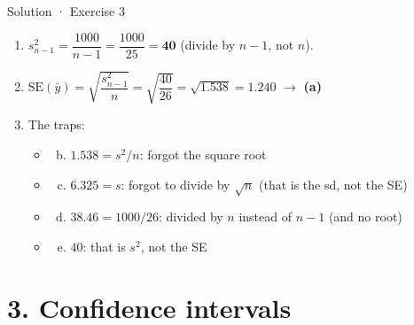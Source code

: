 \documentclass[
  11pt,
  ignorenonframetext,
  aspectratio=169,
]{beamer}
\providecommand{\tightlist}{%
  \setlength{\itemsep}{0pt}\setlength{\parskip}{0pt}}
\newcommand{\se}{\mathrm{SE}}
\begin{document}
\begin{frame}{Solution · Exercise 3}
\protect{}\label{solution-exercise-3}
\begin{enumerate}
\item
  \(s^2_{n-1}=\dfrac{1000}{n-1}=\dfrac{1000}{25}=\mathbf{40}\) (divide
  by \(n-1\), not \(n\)).
\item
  \(\se(\bar y)=\sqrt{\dfrac{s^2_{n-1}}{n}}=\sqrt{\dfrac{40}{26}}=\sqrt{1.538}=\mathbf{1.240}\)
  \(\to\) \textbf{(a)}
\item
  The traps:

  \begin{itemize}
  \tightlist
  \item
    \begin{enumerate}
    [(a)]
    \setcounter{enumii}{1}
    \tightlist
    \item
      \(1.538=s^2/n\): forgot the square root
    \end{enumerate}
  \item
    \begin{enumerate}
    [(a)]
    \setcounter{enumii}{2}
    \tightlist
    \item
      \(6.325=s\): forgot to divide by \(\sqrt n\) (that is the sd, not
      the SE)
    \end{enumerate}
  \item
    \begin{enumerate}
    [(a)]
    \setcounter{enumii}{3}
    \tightlist
    \item
      \(38.46=1000/26\): divided by \(n\) instead of \(n-1\) (and no
      root)
    \end{enumerate}
  \item
    \begin{enumerate}
    [(a)]
    \setcounter{enumii}{4}
    \tightlist
    \item
      \(40\): that is \(s^2\), not the SE
    \end{enumerate}
  \end{itemize}
\end{enumerate}
\end{frame}

\section{3. Confidence intervals}\label{confidence-intervals}
\end{document}
